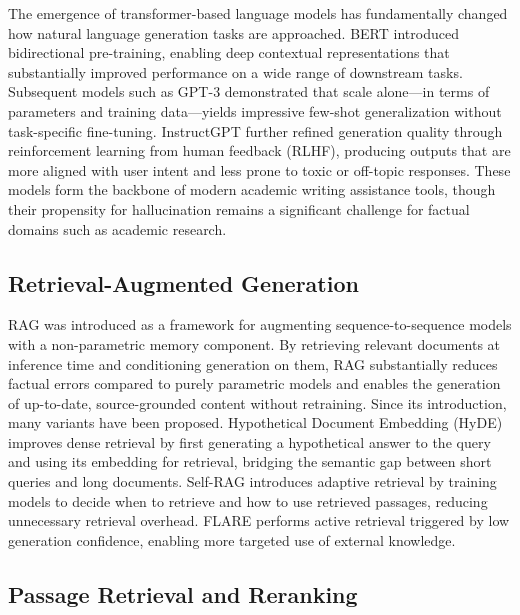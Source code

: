 \documentclass[12pt, a4paper]{article}
\begin{document}
The emergence of transformer-based language models \cite{devlin2019} has
fundamentally changed how natural language generation tasks are approached.
BERT \cite{devlin2019} introduced bidirectional pre-training, enabling deep
contextual representations that substantially improved performance on a wide range
of downstream tasks. Subsequent models such as GPT-3 \cite{brown2020} demonstrated
that scale alone---in terms of parameters and training data---yields impressive
few-shot generalization without task-specific fine-tuning. InstructGPT
\cite{ouyang2022} further refined generation quality through reinforcement learning
from human feedback (RLHF), producing outputs that are more aligned with user
intent and less prone to toxic or off-topic responses. These models form the
backbone of modern academic writing assistance tools, though their propensity for
hallucination remains a significant challenge for factual domains such as academic
research.

\subsection{Retrieval-Augmented Generation}

RAG \cite{lewis2020} was introduced as a framework for augmenting
sequence-to-sequence models with a non-parametric memory component. By retrieving
relevant documents at inference time and conditioning generation on them, RAG
substantially reduces factual errors compared to purely parametric models and
enables the generation of up-to-date, source-grounded content without retraining.
Since its introduction, many variants have been proposed. Hypothetical Document
Embedding (HyDE) \cite{gao2022} improves dense retrieval by first generating a
hypothetical answer to the query and using its embedding for retrieval, bridging
the semantic gap between short queries and long documents. Self-RAG
\cite{asai2023} introduces adaptive retrieval by training models to decide when
to retrieve and how to use retrieved passages, reducing unnecessary retrieval
overhead. FLARE \cite{jiang2023} performs active retrieval triggered by low
generation confidence, enabling more targeted use of external knowledge.

\subsection{Passage Retrieval and Reranking}
\end{document}
